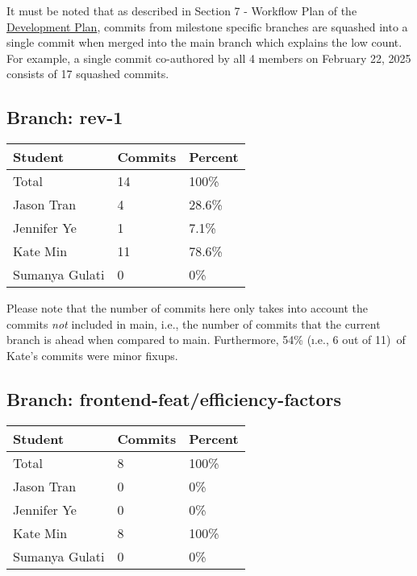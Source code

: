 \documentclass{article}
\begin{document}
It must be noted that as described in Section 7 - Workflow Plan of the
\href{https://github.com/SumanyaG/Alkalytics/blob/main/docs/DevelopmentPlan/DevelopmentPlan.pdf}{Development Plan},
commits from milestone specific branches are squashed into a single
commit when merged into the main branch which explains the low count. For
example, a single commit co-authored by all 4 members on February 22, 2025 consists of 
17 squashed commits. 

\subsection{Branch: rev-1}

\begin{table}[H]
\centering
\begin{tabular}{lll}
\toprule
\textbf{Student} & \textbf{Commits} & \textbf{Percent}\\
\midrule
Total & 14 & 100\% \\
Jason Tran & 4 & 28.6\% \\
Jennifer Ye & 1 & 7.1\% \\
Kate Min & 11 & 78.6\% \\
Sumanya Gulati & 0 & 0\% \\
\bottomrule
\end{tabular}
\end{table}

Please note that the number of commits here only takes into account the commits \emph{not}
included in main, i.e., the number of commits that the current branch is ahead when compared 
to main. Furthermore, 54\% (\i.e., 6 out of 11)\ of Kate's commits were minor fixups.

\subsection{Branch: frontend-feat/efficiency-factors}

\begin{table}[H]
\centering
\begin{tabular}{lll}
\toprule
\textbf{Student} & \textbf{Commits} & \textbf{Percent}\\
\midrule
Total & 8 & 100\% \\
Jason Tran & 0 & 0\% \\
Jennifer Ye & 0 & 0\% \\
Kate Min & 8 & 100\% \\
Sumanya Gulati & 0 & 0\% \\
\bottomrule
\end{tabular}
\end{table}
\end{document}
